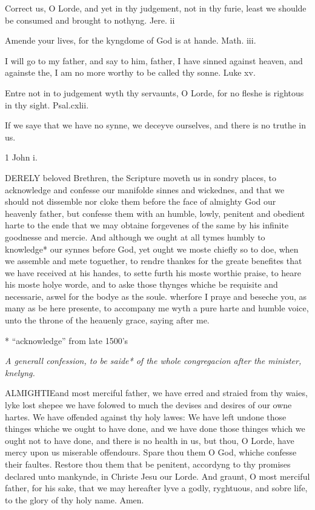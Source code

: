 Correct us, O Lorde, and yet in thy judgement, not in thy furie, least
we shoulde be consumed and brought to nothyng. Jere.
ii

Amende your lives, for the kyngdome of God is at hande. Math.
iii.

I will go to my father, and say to him, father, I have sinned against
heaven, and againste the, I am no more worthy to be called thy sonne.
Luke
xv.

Entre not in to judgement wyth thy servaunts, O Lorde, for no fleshe is
rightous in thy sight. Psal.cxlii.

If we saye that we have no synne, we deceyve ourselves, and there is no
truthe in us.

1 John i.

DERELY
beloved Brethren, the Scripture moveth us in sondry places, to acknowledge
and confesse our manifolde sinnes and wickednes, and that we should not
dissemble nor cloke them before the face of almighty God our heavenly
father, but confesse them with an humble, lowly, penitent and obedient
harte to the ende that we may obtaine forgevenes of the same by his infinite
goodnesse and mercie. And although we ought at all tymes humbly to knowledge*
our synnes before God, yet ought we moste chiefly so to doe, when we assemble
and mete toguether, to rendre thankes for the greate benefites that we
have received at his handes, to sette furth his moste worthie praise,
to heare his moste holye worde, and to aske those thynges whiche be requisite
and necessarie, aswel for the bodye as the soule. wherfore I praye and
beseche you, as many as be here presente, to accompany me wyth a pure
harte and humble voice, unto the throne of the heauenly grace, saying
after me.

* ``acknowledge''
from late 1500's

\emph{A
generall confession, to be saide* of the whole congregacion after the
minister, knelyng.}

ALMIGHTIE\textbf{}and most merciful father, we have erred and straied from thy waies,
lyke lost shepee we have folowed to much the devises and desires of our
owne hartes. We have offended against thy holy lawes: We have left undone
those thinges whiche we ought to have done, and we have done those thinges
which we ought not to have done, and there is no health in us, but thou,
O Lorde, have mercy upon us miserable offendours. Spare thou them O God,
whiche confesse their faultes. Restore thou them that be penitent, accordyng
to thy promises declared unto mankynde, in Christe Jesu our Lorde. And
graunt, O most merciful father, for his sake, that we may hereafter lyve
a godly, ryghtuous, and sobre life, to the glory of thy holy name. Amen.

